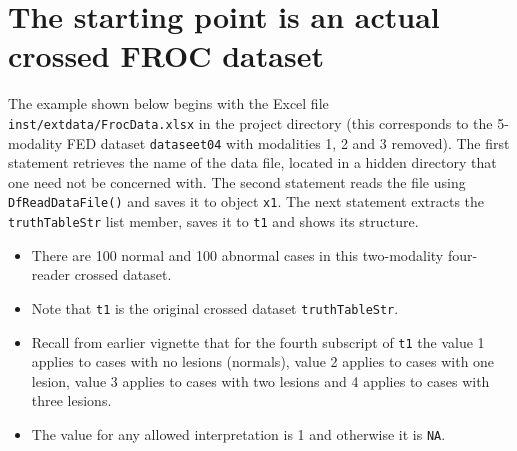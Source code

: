 \documentclass[]{book}
\newenvironment{Shaded}{\begin{snugshade}}{\end{snugshade}}
\newcommand{\CommentTok}[1]{\textcolor[rgb]{0.56,0.35,0.01}{\textit{#1}}}
\newcommand{\DataTypeTok}[1]{\textcolor[rgb]{0.13,0.29,0.53}{#1}}
\newcommand{\KeywordTok}[1]{\textcolor[rgb]{0.13,0.29,0.53}{\textbf{#1}}}
\newcommand{\NormalTok}[1]{#1}
\newcommand{\OperatorTok}[1]{\textcolor[rgb]{0.81,0.36,0.00}{\textbf{#1}}}
\newcommand{\OtherTok}[1]{\textcolor[rgb]{0.56,0.35,0.01}{#1}}
\newcommand{\StringTok}[1]{\textcolor[rgb]{0.31,0.60,0.02}{#1}}
\providecommand{\tightlist}{%
  \setlength{\itemsep}{0pt}\setlength{\parskip}{0pt}}
\begin{document}
\hypertarget{the-starting-point-is-an-actual-crossed-froc-dataset}{%
\section{The starting point is an actual crossed FROC dataset}\label{the-starting-point-is-an-actual-crossed-froc-dataset}}

The example shown below begins with the Excel file \texttt{inst/extdata/FrocData.xlsx} in the project directory (this corresponds to the 5-modality FED dataset \texttt{dataseet04} \citep{RN1882} with modalities 1, 2 and 3 removed). The first statement retrieves the name of the data file, located in a hidden directory that one need not be concerned with. The second statement reads the file using \texttt{DfReadDataFile()} and saves it to object \texttt{x1}. The next statement extracts the \texttt{truthTableStr} list member, saves it to \texttt{t1} and shows its structure.

\begin{Shaded}
\end{Shaded}

\begin{itemize}
\tightlist
\item
  There are 100 normal and 100 abnormal cases in this two-modality four-reader crossed dataset.
\item
  Note that \texttt{t1} is the original crossed dataset \texttt{truthTableStr}.
\item
  Recall from earlier vignette that for the fourth subscript of \texttt{t1} the value 1 applies to cases with no lesions (normals), value 2 applies to cases with one lesion, value 3 applies to cases with two lesions and 4 applies to cases with three lesions.
\item
  The value for any allowed interpretation is 1 and otherwise it is \texttt{NA}.
\end{itemize}
\end{document}
